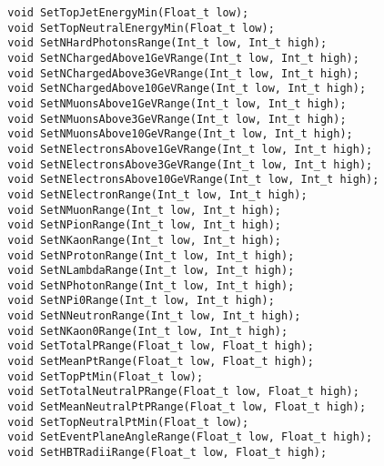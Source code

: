 {\begin{verbatim}
  void SetTopJetEnergyMin(Float_t low);
  void SetTopNeutralEnergyMin(Float_t low);
  void SetNHardPhotonsRange(Int_t low, Int_t high);
  void SetNChargedAbove1GeVRange(Int_t low, Int_t high);
  void SetNChargedAbove3GeVRange(Int_t low, Int_t high);
  void SetNChargedAbove10GeVRange(Int_t low, Int_t high);
  void SetNMuonsAbove1GeVRange(Int_t low, Int_t high);
  void SetNMuonsAbove3GeVRange(Int_t low, Int_t high);
  void SetNMuonsAbove10GeVRange(Int_t low, Int_t high);
  void SetNElectronsAbove1GeVRange(Int_t low, Int_t high);
  void SetNElectronsAbove3GeVRange(Int_t low, Int_t high);
  void SetNElectronsAbove10GeVRange(Int_t low, Int_t high);
  void SetNElectronRange(Int_t low, Int_t high);
  void SetNMuonRange(Int_t low, Int_t high);
  void SetNPionRange(Int_t low, Int_t high);
  void SetNKaonRange(Int_t low, Int_t high);
  void SetNProtonRange(Int_t low, Int_t high);
  void SetNLambdaRange(Int_t low, Int_t high);
  void SetNPhotonRange(Int_t low, Int_t high);
  void SetNPi0Range(Int_t low, Int_t high);
  void SetNNeutronRange(Int_t low, Int_t high);
  void SetNKaon0Range(Int_t low, Int_t high); 
  void SetTotalPRange(Float_t low, Float_t high);
  void SetMeanPtRange(Float_t low, Float_t high);
  void SetTopPtMin(Float_t low);
  void SetTotalNeutralPRange(Float_t low, Float_t high);
  void SetMeanNeutralPtPRange(Float_t low, Float_t high);
  void SetTopNeutralPtMin(Float_t low);
  void SetEventPlaneAngleRange(Float_t low, Float_t high);
  void SetHBTRadiiRange(Float_t low, Float_t high);
\end{verbatim}
}